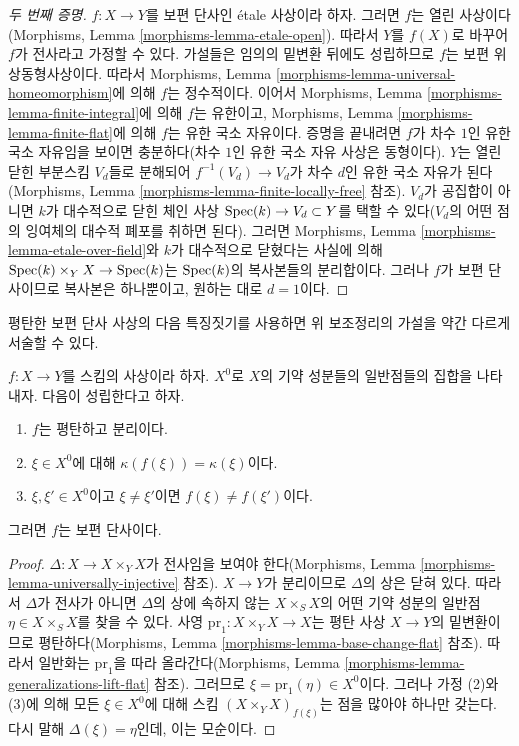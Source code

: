 \begin{proof}[두 번째 증명]
$f : X \to Y$를 보편 단사인 \'etale 사상이라 하자. 그러면 $f$는 열린
사상이다(Morphisms, Lemma \ref{morphisms-lemma-etale-open}). 따라서
$Y$를 $f(X)$로 바꾸어 $f$가 전사라고 가정할 수 있다. 가설들은 임의의
밑변환 뒤에도 성립하므로 $f$는 보편 위상동형사상이다. 따라서 Morphisms,
Lemma \ref{morphisms-lemma-universal-homeomorphism}에 의해 $f$는
정수적이다. 이어서 Morphisms, Lemma
\ref{morphisms-lemma-finite-integral}에 의해 $f$는 유한이고, Morphisms,
Lemma \ref{morphisms-lemma-finite-flat}에 의해 $f$는 유한 국소
자유이다. 증명을 끝내려면 $f$가 차수 $1$인 유한 국소 자유임을 보이면
충분하다(차수 $1$인 유한 국소 자유 사상은 동형이다). $Y$는 열린닫힌
부분스킴 $V_d$들로 분해되어 $f^{-1}(V_d) \to V_d$가 차수 $d$인 유한
국소 자유가 된다(Morphisms, Lemma
\ref{morphisms-lemma-finite-locally-free} 참조). $V_d$가 공집합이
아니면 $k$가 대수적으로 닫힌 체인 사상
$\mathop{\mathrm{Spec}}(k) \to V_d \subset Y$를 택할 수 있다($V_d$의 어떤 점의 잉여체의
대수적 폐포를 취하면 된다). 그러면 Morphisms, Lemma
\ref{morphisms-lemma-etale-over-field}와 $k$가 대수적으로 닫혔다는
사실에 의해 $\mathop{\mathrm{Spec}}(k) \times_Y X \to \mathop{\mathrm{Spec}}(k)$는 $\mathop{\mathrm{Spec}}(k)$의
복사본들의 분리합이다. 그러나 $f$가 보편 단사이므로 복사본은 하나뿐이고,
원하는 대로 $d = 1$이다.
\end{proof}

\noindent
평탄한 보편 단사 사상의 다음 특징짓기를 사용하면 위 보조정리의 가설을
약간 다르게 서술할 수 있다.

\begin{lemma}
\label{lemma-flat-universally-injective}
$f : X \to Y$를 스킴의 사상이라 하자. $X^0$로 $X$의 기약 성분들의
일반점들의 집합을 나타내자. 다음이 성립한다고 하자.
\begin{enumerate}
\item $f$는 평탄하고 분리이다.
\item $\xi \in X^0$에 대해 $\kappa(f(\xi)) = \kappa(\xi)$이다.
\item $\xi, \xi' \in X^0$이고 $\xi \not = \xi'$이면
$f(\xi) \not = f(\xi')$이다.
\end{enumerate}
그러면 $f$는 보편 단사이다.
\end{lemma}

\begin{proof}
$\Delta : X \to X \times_Y X$가 전사임을 보여야 한다(Morphisms, Lemma
\ref{morphisms-lemma-universally-injective} 참조). $X \to Y$가
분리이므로 $\Delta$의 상은 닫혀 있다. 따라서 $\Delta$가 전사가 아니면
$\Delta$의 상에 속하지 않는 $X \times_S X$의 어떤 기약 성분의 일반점
$\eta \in X \times_S X$를 찾을 수 있다. 사영
$\text{pr}_1 : X \times_Y X \to X$는 평탄 사상 $X \to Y$의
밑변환이므로 평탄하다(Morphisms, Lemma
\ref{morphisms-lemma-base-change-flat} 참조). 따라서 일반화는
$\text{pr}_1$을 따라 올라간다(Morphisms, Lemma
\ref{morphisms-lemma-generalizations-lift-flat} 참조). 그러므로
$\xi = \text{pr}_1(\eta) \in X^0$이다. 그러나 가정 (2)와 (3)에 의해
모든 $\xi \in X^0$에 대해 스킴 $(X \times_Y X)_{f(\xi)}$는 점을
많아야 하나만 갖는다. 다시 말해 $\Delta(\xi) = \eta$인데, 이는
모순이다.
\end{proof}

